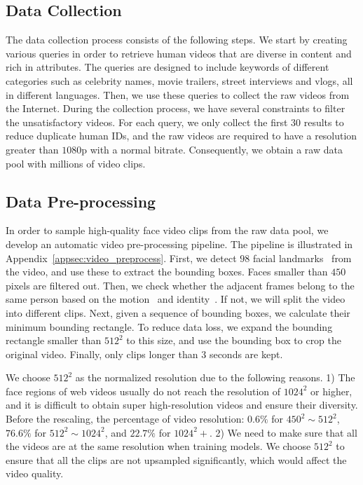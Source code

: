 \documentclass[runningheads]{llncs}
\begin{document}
\subsection{Data Collection}

The data collection process consists of the following steps. 
We start by creating various queries in order to retrieve human videos that are diverse in content and rich in attributes. The queries are designed to include keywords of different categories such as celebrity names, movie trailers, street interviews and vlogs, all in different languages. 
Then, we use these queries to collect the raw videos from the Internet. During the collection process, we have several constraints to filter the unsatisfactory videos. For each query, we only collect the first $30$ results to reduce duplicate human IDs, and the raw videos are required to have a resolution greater than $1080$p with a normal bitrate. Consequently, we obtain a raw data pool with millions of video clips.


\subsection{Data Pre-processing}
\label{sec:video_preprocess}
In order to sample high-quality face video clips from the raw data pool, we develop an automatic video pre-processing pipeline. The pipeline is illustrated in Appendix~\ref{appsec:video_preprocess}.
First, we detect $98$ facial landmarks~\cite{wu2018look} from the video, and use these to extract the bounding boxes. Faces smaller than $450$ pixels are filtered out. Then, we check whether the adjacent frames belong to the same person based on the motion~\cite{sort} and identity~\cite{arcface}. If not, we will split the video into different clips.
Next, given a sequence of bounding boxes, we calculate their minimum bounding rectangle. To reduce data loss, we expand the bounding rectangle smaller than $512^2$ to this size, and use the bounding box to crop the original video.
Finally, only clips longer than 3 seconds are kept.



We choose $512^2$ as the normalized resolution due to the following reasons. 
1) The face regions of web videos usually do not reach the resolution of $1024^2$ or higher, and it is difficult to obtain super high-resolution videos and ensure their diversity. Before the rescaling, the percentage of video resolution: $0.6\%$ for $450^2{\sim}512^2$, $76.6\%$ for $512^2{\sim}1024^2$, and $22.7\%$ for $1024^2+$.
2) We need to make sure that all the videos are at the same resolution when training models. We choose $512^2$ to ensure that all the clips are not upsampled significantly, which would affect the video quality.
\end{document}

